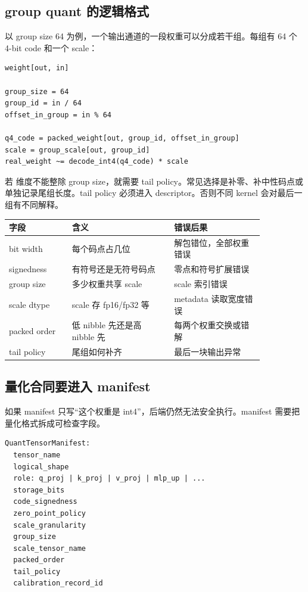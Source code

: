 \subsection{group quant 的逻辑格式}

以 group size 64 为例，一个输出通道的一段权重可以分成若干组。每组有 64 个 4-bit code 和一个 scale：

\begin{lstlisting}[numbers=none,caption={group-wise int4 权重的逻辑形状}]
weight[out, in]

group_size = 64
group_id = in / 64
offset_in_group = in % 64

q4_code = packed_weight[out, group_id, offset_in_group]
scale = group_scale[out, group_id]
real_weight ~= decode_int4(q4_code) * scale
\end{lstlisting}

若  维度不能整除 group size，就需要 tail policy。常见选择是补零、补中性码点或单独记录尾组长度。tail policy 必须进入 descriptor。否则不同 kernel 会对最后一组有不同解释。

\begin{center}
\begin{tabular}{p{0.21\linewidth}p{0.34\linewidth}p{0.30\linewidth}}
\toprule
字段 & 含义 & 错误后果 \\
\midrule
bit width & 每个码点占几位 & 解包错位，全部权重错误 \\
signedness & 有符号还是无符号码点 & 零点和符号扩展错误 \\
group size & 多少权重共享 scale & scale 索引错误 \\
scale dtype & scale 存 fp16/fp32 等 & metadata 读取宽度错误 \\
packed order & 低 nibble 先还是高 nibble 先 & 每两个权重交换或错解 \\
tail policy & 尾组如何补齐 & 最后一块输出异常 \\
\bottomrule
\end{tabular}
\end{center}

\subsection{量化合同要进入 manifest}

如果 manifest 只写“这个权重是 int4”，后端仍然无法安全执行。manifest 需要把量化格式拆成可检查字段。

\begin{lstlisting}[numbers=none,caption={manifest 中的量化字段草图}]
QuantTensorManifest:
  tensor_name
  logical_shape
  role: q_proj | k_proj | v_proj | mlp_up | ...
  storage_bits
  code_signedness
  zero_point_policy
  scale_granularity
  group_size
  scale_tensor_name
  packed_order
  tail_policy
  calibration_record_id
\end{lstlisting}

